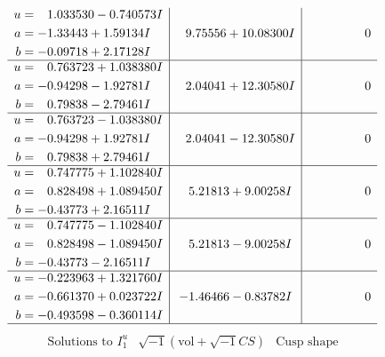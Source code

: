 \documentclass[1p]{elsarticle_modified}
\theoremstyle{definition}
\newcommand{\I}{\sqrt{-1}}
\begin{document}
$$\begin{array}{c|c|c}
\begin{aligned}
u &= \phantom{-}1.033530 - 0.740573 I \\
a &= -1.33443 + 1.59134 I \\
b &= -0.09718 + 2.17128 I\end{aligned}
 & \phantom{-}9.75556 + 10.08300 I & \phantom{-0.000000 } 0 \\ \hline\begin{aligned}
u &= \phantom{-}0.763723 + 1.038380 I \\
a &= -0.94298 - 1.92781 I \\
b &= \phantom{-}0.79838 - 2.79461 I\end{aligned}
 & \phantom{-}2.04041 + 12.30580 I & \phantom{-0.000000 } 0 \\ \hline\begin{aligned}
u &= \phantom{-}0.763723 - 1.038380 I \\
a &= -0.94298 + 1.92781 I \\
b &= \phantom{-}0.79838 + 2.79461 I\end{aligned}
 & \phantom{-}2.04041 - 12.30580 I & \phantom{-0.000000 } 0 \\ \hline\begin{aligned}
u &= \phantom{-}0.747775 + 1.102840 I \\
a &= \phantom{-}0.828498 + 1.089450 I \\
b &= -0.43773 + 2.16511 I\end{aligned}
 & \phantom{-}5.21813 + 9.00258 I & \phantom{-0.000000 } 0 \\ \hline\begin{aligned}
u &= \phantom{-}0.747775 - 1.102840 I \\
a &= \phantom{-}0.828498 - 1.089450 I \\
b &= -0.43773 - 2.16511 I\end{aligned}
 & \phantom{-}5.21813 - 9.00258 I & \phantom{-0.000000 } 0 \\ \hline\begin{aligned}
u &= -0.223963 + 1.321760 I \\
a &= -0.661370 + 0.023722 I \\
b &= -0.493598 - 0.360114 I\end{aligned}
 & -1.46466 - 0.83782 I & \phantom{-0.000000 } 0\\
 \hline 
 \end{array}$$\newpage$$\begin{array}{c|c|c}  
\text{Solutions to }I^u_{1}& \I (\text{vol} + \sqrt{-1}CS) & \text{Cusp shape}\\
 \hline 
\begin{aligned}

\end{aligned}
\end{array}$$
\end{document}
